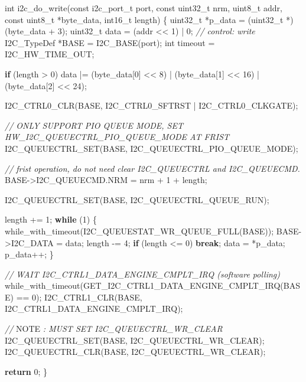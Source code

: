 \documentclass[
  12pt,
]{book}
\newenvironment{Shaded}{\begin{snugshade}}{\end{snugshade}}
\newcommand{\AlertTok}[1]{\textcolor[rgb]{0.94,0.16,0.16}{#1}}
\newcommand{\CommentTok}[1]{\textcolor[rgb]{0.56,0.35,0.01}{\textit{#1}}}
\newcommand{\ControlFlowTok}[1]{\textcolor[rgb]{0.13,0.29,0.53}{\textbf{#1}}}
\newcommand{\DataTypeTok}[1]{\textcolor[rgb]{0.13,0.29,0.53}{#1}}
\newcommand{\DecValTok}[1]{\textcolor[rgb]{0.00,0.00,0.81}{#1}}
\newcommand{\NormalTok}[1]{#1}
\begin{document}
\begin{Shaded}
\begin{Highlighting}[]
\DataTypeTok{int}\NormalTok{ i2c_do_write(}\DataTypeTok{const}\NormalTok{ i2c_port_t port, }\DataTypeTok{const} \DataTypeTok{uint32_t}\NormalTok{ nrm, }\DataTypeTok{uint8_t}\NormalTok{ addr, }\DataTypeTok{const} \DataTypeTok{uint8_t}\NormalTok{ *byte_data, }\DataTypeTok{int16_t}\NormalTok{ length)}
\NormalTok{\{}
    \DataTypeTok{uint32_t}\NormalTok{ *p_data = (}\DataTypeTok{uint32_t}\NormalTok{ *)(byte_data + }\DecValTok{3}\NormalTok{);}
    \DataTypeTok{uint32_t}\NormalTok{ data = (addr <<  }\DecValTok{1}\NormalTok{) | }\DecValTok{0}\NormalTok{;     }\CommentTok{// control: write}
\NormalTok{    I2C_TypeDef *BASE = I2C_BASE(port);}
    \DataTypeTok{int}\NormalTok{ timeout = I2C_HW_TIME_OUT;}

    \ControlFlowTok{if}\NormalTok{ (length > }\DecValTok{0}\NormalTok{)}
\NormalTok{        data |= (byte_data[}\DecValTok{0}\NormalTok{] <<  }\DecValTok{8}\NormalTok{) | (byte_data[}\DecValTok{1}\NormalTok{] << }\DecValTok{16}\NormalTok{) | (byte_data[}\DecValTok{2}\NormalTok{] << }\DecValTok{24}\NormalTok{);}

\NormalTok{    I2C_CTRL0_CLR(BASE, I2C_CTRL0_SFTRST | I2C_CTRL0_CLKGATE);}

    \CommentTok{// ONLY SUPPORT PIO QUEUE MODE, SET HW_I2C_QUEUECTRL_PIO_QUEUE_MODE AT FRIST}
\NormalTok{    I2C_QUEUECTRL_SET(BASE, I2C_QUEUECTRL_PIO_QUEUE_MODE);}

    \CommentTok{// frist operation, do not need clear I2C_QUEUECTRL and I2C_QUEUECMD.}
\NormalTok{    BASE->I2C_QUEUECMD.NRM = nrm + }\DecValTok{1}\NormalTok{ + length;}

\NormalTok{    I2C_QUEUECTRL_SET(BASE, I2C_QUEUECTRL_QUEUE_RUN);}


\NormalTok{    length += }\DecValTok{1}\NormalTok{;}
    \ControlFlowTok{while}\NormalTok{ (}\DecValTok{1}\NormalTok{)}
\NormalTok{    \{}
\NormalTok{        while_with_timeout(I2C_QUEUESTAT_WR_QUEUE_FULL(BASE));}
\NormalTok{        BASE->I2C_DATA = data;}
\NormalTok{        length -= }\DecValTok{4}\NormalTok{;}
        \ControlFlowTok{if}\NormalTok{ (length <= }\DecValTok{0}\NormalTok{)}
            \ControlFlowTok{break}\NormalTok{;}
\NormalTok{        data = *p_data;}
\NormalTok{        p_data++;}
\NormalTok{    \}}

    \CommentTok{// WAIT I2C_CTRL1_DATA_ENGINE_CMPLT_IRQ (software polling)}
\NormalTok{    while_with_timeout(GET_I2C_CTRL1_DATA_ENGINE_CMPLT_IRQ(BASE) == }\DecValTok{0}\NormalTok{);}
\NormalTok{    I2C_CTRL1_CLR(BASE, I2C_CTRL1_DATA_ENGINE_CMPLT_IRQ);}

    \CommentTok{// }\AlertTok{NOTE}\CommentTok{ : MUST SET I2C_QUEUECTRL_WR_CLEAR}
\NormalTok{    I2C_QUEUECTRL_SET(BASE, I2C_QUEUECTRL_WR_CLEAR);}
\NormalTok{    I2C_QUEUECTRL_CLR(BASE, I2C_QUEUECTRL_WR_CLEAR);}

    \ControlFlowTok{return} \DecValTok{0}\NormalTok{;}
\NormalTok{\}}
\end{Highlighting}
\end{Shaded}
\end{document}
